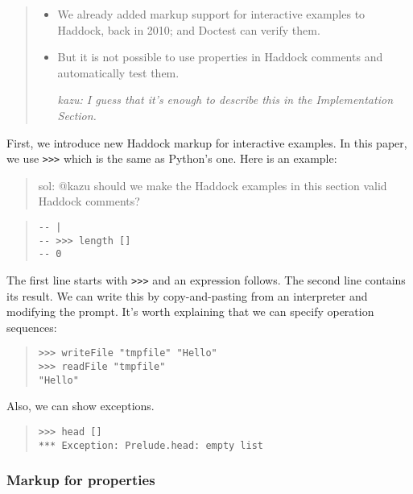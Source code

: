 \documentclass[preprint]{sigplanconf}
\begin{document}
\begin{quote}
\begin{itemize}
    \item
        We already added markup support for interactive examples to
        Haddock, back in 2010; and Doctest can verify them.
    \item
        But it is not possible to use properties in Haddock comments
        and automatically test them.

    \emph{kazu: I guess that it's enough to describe this in the Implementation Section.}
\end{itemize}
\end{quote}

\noindent First, we introduce new Haddock markup for interactive examples.
In this paper, we use {\tt >>>} which is the same as Python's one.
Here is an example:


\begin{quote}
    sol: @kazu should we make the Haddock examples in this section
    valid Haddock comments?
\end{quote}

\begin{quote}
\small
\begin{verbatim}
-- |
-- >>> length []
-- 0
\end{verbatim}
\end{quote}

\noindent The first line starts with {\tt >>>} and an expression follows. The second line contains its result. We can write this by copy-and-pasting from an interpreter and modifying the prompt.
It's worth explaining that we can specify operation sequences:

\begin{quote}
\small
\begin{verbatim}
>>> writeFile "tmpfile" "Hello"
>>> readFile "tmpfile"
"Hello"
\end{verbatim}
\end{quote}

\noindent Also, we can show exceptions.

\begin{quote}
\small
\begin{verbatim}
>>> head []
*** Exception: Prelude.head: empty list
\end{verbatim}
\end{quote}

\subsubsection{Markup for properties}
\label{sec:markup}
\end{document}
